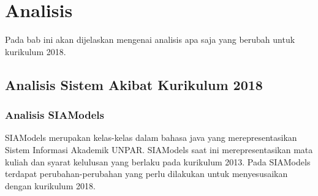 \chapter{Analisis}
\label{chap:analisis}

Pada bab ini akan dijelaskan mengenai analisis apa saja yang berubah untuk kurikulum 2018.
\section{Analisis Sistem Akibat Kurikulum 2018}

\subsection{Analisis SIAModels}
\label{subbab:analisissiamodels}

SIAModels merupakan kelas-kelas dalam bahasa java yang merepresentasikan Sistem Informasi Akademik UNPAR. SIAModels saat ini merepresentasikan mata kuliah dan syarat kelulusan yang berlaku pada kurikulum 2013. Pada SIAModels terdapat perubahan-perubahan yang perlu dilakukan untuk menyesusaikan dengan kurikulum 2018.

